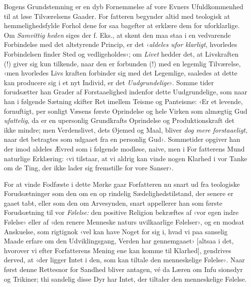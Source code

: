 \documentclass[12pt,a4paper,openany]{book}
\newcommand{\opage}[1]{\marginnote{\footnotesize\textit{[#1]}}}
\begin{document}
Bogens Grundstemning er en dyb Fornemmelse af vore
Evners Ufuldkommenhed til at løse Tilværelsens Gaader. For%
\opage{23}fatteren begynder altid med teologisk at hemmelighedsfylde Forhol\-%
dene for saa bagefter at erklære dem for uforklarlige. Om \emph{Samvittig\-%
heden} siges der f. Eks., at skønt den maa staa i en vedvarende
Forbindelse med det altstyrende Princip, er det ‹\emph{aldeles ufor\-%
klarligt}, hvorledes Forbindelsen finder Sted og vedligeholdes‹; om
\emph{Livet} hedder det, at Livskraften (!) giver sig kun tilkende, naar den
er forbunden (!) med en legemlig Tilværelse, ‹men hvorledes Livs\-%
kraften forbinder sig med det Legemlige, saaledes at dette kan
producere sig i et nyt Individ, er det \emph{Uudgrundelige}›. Somme\-%
tider forudsætter han Grader af Forstaaelighed indenfor dette
Uudgrundelige, som naar han i følgende Sætning skifter Ret
imellem Teisme og Panteisme: ‹Er et levende, fornuftigt, per\-%
sonligt Væsens første Oprindelse og hele Virken som almægtig
Gud \emph{ufattelig}, da er en upersonlig Grundkrafts Oprindelse og
Produktionskraft det ikke mindre; men Verdenslivet, dets Øjemed
og Maal, bliver \emph{dog mere forstaaeligt}, naar det betragtes som
udgaaet fra en personlig Gud›. Sommetider opgiver han der\-%
imod aldeles Ævred som i følgende modløse, naive, men i For\-%
fatterens Mund naturlige Erklæring: ‹vi tilstaar, at vi aldrig
kan vinde nogen Klarhed i vor Tanke om de Ting, der ikke
lader sig fremstille for vore Sanser›.

For at vinde Fodfæste i dette Mørke gaar Forfatteren nu
snart ud fra teologiske Forudsætninger som den om en op\-%
rindelig Sædelighedstilstand, der senere er gaaet tabt, eller
som den om Arvesynden, snart appellerer han som første
Forudsætning til vor \emph{Følelse:} den positive Religion bekræftes
af ‹vor egen indre Følelse› eller af ‹den renere Menneske\-%
naturs uvilkaarlige Følelser›, og en modsat Anskuelse, som
rigtignok ‹vel kan have Noget for sig i, hvad vi paa sanselig
Maade erfare om den Udviklingsgang, Verden har gennemgaaet›
[altsaa i det, hvorover vi efter Forfatterens Mening ene kan
komme til Klarhed], gendrives derved, at ‹der ligger Intet i den,
som kan tiltale den menneskelige Følelse›. Naar først denne
Rettesnor for Sandhed bliver antagen, vé da Læren om Infu\-%
sionsdyr og Trikiner; thi sandelig disse Dyr har Intet, der
tiltaler den menneskelige Følelse.
\end{document}
